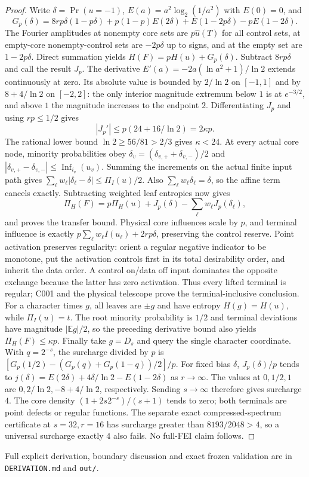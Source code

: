 \documentclass{article}
\begin{document}
\begin{proof}
Write $\delta=\Pr(u=-1)$, $E(a)=a^2\log_2(1/a^2)$ with $E(0)=0$, and
\[G_p(\delta)=8rp\delta(1-p\delta)+p(1-p)E(2\delta)+E(1-2p\delta)-pE(1-2\delta).\]
The Fourier amplitudes at nonempty core sets are $p\widehat u(T)$ for all control sets, at empty-core nonempty-control sets are $-2p\delta$ up to signs, and at the empty set are $1-2p\delta$. Direct summation yields $H(F)=pH(u)+G_p(\delta)$.
Subtract $8rp\delta$ and call the result $J_p$. The derivative $E'(a)=-2a(\ln a^2+1)/\ln2$ extends continuously at zero. Its absolute value is bounded by $2/\ln2$ on $[-1,1]$ and by $8+4/\ln2$ on $[-2,2]$: the only interior magnitude extremum below $1$ is at $e^{-3/2}$, and above $1$ the magnitude increases to the endpoint $2$. Differentiating $J_p$ and using $rp\le1/2$ gives
\[|J_p'|\le p(24+16/\ln2)=2\kappa p.\]
The rational lower bound $\ln2\ge56/81>2/3$ gives $\kappa<24$.
At every actual core node, minority probabilities obey $\delta_v=(\delta_{v,+}+\delta_{v,-})/2$ and $|\delta_{v,+}-\delta_{v,-}|\le\operatorname{Inf}_{i_v}(u_v)$. Summing the increments on the actual finite input path gives $\sum_\ell w_\ell|\delta_\ell-\delta|\le\Pi_I(u)/2$. Also $\sum_\ell w_\ell\delta_\ell=\delta$, so the affine term cancels exactly. Subtracting weighted leaf entropies now gives
\[\Pi_H(F)=p\Pi_H(u)+J_p(\delta)-\sum_\ell w_\ell J_p(\delta_\ell),\]
and proves the transfer bound. Physical core influences scale by $p$, and terminal influence is exactly $p\sum_\ell w_\ell I(u_\ell)+2rp\delta$, preserving the control reserve.
Point activation preserves regularity: orient a regular negative indicator to be monotone, put the activation controls first in its total desirability order, and inherit the data order. A control on/data off input dominates the opposite exchange because the latter has zero activation. Thus every lifted terminal is regular; C001 and the physical telescope prove the terminal-inclusive conclusion.
For a character times $g$, all leaves are $\pm g$ and have entropy $H(g)=H(u)$, while $\Pi_I(u)=t$. The root minority probability is $1/2$ and terminal deviations have magnitude $|\mathbb Eg|/2$, so the preceding derivative bound also yields $\Pi_H(F)\le\kappa p$.
Finally take $g=D_s$ and query the single character coordinate. With $q=2^{-s}$, the surcharge divided by $p$ is $[G_p(1/2)-(G_p(q)+G_p(1-q))/2]/p$. For fixed bias $\delta$, $J_p(\delta)/p$ tends to $j(\delta)=E(2\delta)+4\delta/\ln2-E(1-2\delta)$ as $r\to\infty$. The values at $0,1/2,1$ are $0,2/\ln2,-8+4/\ln2$, respectively. Sending $s\to\infty$ therefore gives surcharge $4$. The core density $(1+2s2^{-s})/(s+1)$ tends to zero; both terminals are point defects or regular functions. The separate exact compressed-spectrum certificate at $s=32,r=16$ has surcharge greater than $8193/2048>4$, so a universal surcharge exactly $4$ also fails. No full-FEI claim follows.
\end{proof}
Full explicit derivation, boundary discussion and exact frozen validation are in \texttt{DERIVATION.md} and \texttt{out/}.
\end{document}
